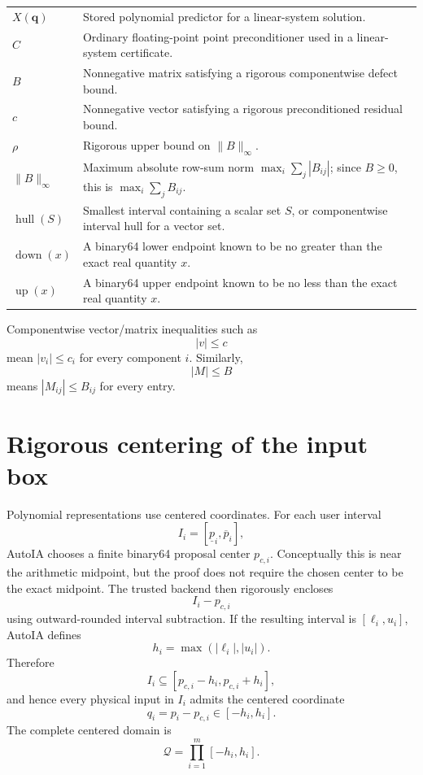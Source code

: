 \documentclass[11pt]{article}
\newcommand{\Qdom}{\mathcal{Q}}
\newcommand{\Hull}{\operatorname{hull}}
\newcommand{\down}{\operatorname{down}}
\newcommand{\up}{\operatorname{up}}
\newcommand{\qv}{\mathbf{q}}
\begin{document}
\begin{longtable}{p{}p{}}
\(X(\qv)\) & Stored polynomial predictor for a linear-system solution. \\
\(C\) & Ordinary floating-point point preconditioner used in a linear-system certificate. \\
\(B\) & Nonnegative matrix satisfying a rigorous componentwise defect bound. \\
\(c\) & Nonnegative vector satisfying a rigorous preconditioned residual bound. \\
\(\rho\) & Rigorous upper bound on \(\|B\|_\infty\). \\
\(\|B\|_\infty\) & Maximum absolute row-sum norm \(\max_i\sum_j |B_{ij}|\); since \(B\ge0\), this is \(\max_i\sum_jB_{ij}\). \\
\(\Hull(S)\) & Smallest interval containing a scalar set \(S\), or componentwise interval hull for a vector set. \\
\(\down(x)\) & A binary64 lower endpoint known to be no greater than the exact real quantity \(x\). \\
\(\up(x)\) & A binary64 upper endpoint known to be no less than the exact real quantity \(x\). \\
\bottomrule
\end{longtable}

Componentwise vector/matrix inequalities such as
\[
  |v|\le c
\]
mean \(|v_i|\le c_i\) for every component \(i\).  Similarly,
\[
  |M|\le B
\]
means \(|M_{ij}|\le B_{ij}\) for every entry.

\section{Rigorous centering of the input box}

Polynomial representations use centered coordinates.  For each user interval
\[
  I_i=[\underline p_i,\overline p_i],
\]
AutoIA chooses a finite binary64 proposal center \(p_{c,i}\).  Conceptually this
is near the arithmetic midpoint, but the proof does not require the chosen center
to be the exact midpoint.  The trusted backend then rigorously encloses
\[
  I_i-p_{c,i}
\]
using outward-rounded interval subtraction.  If the resulting interval is
\([\ell_i,u_i]\), AutoIA defines
\[
  h_i=\max(|\ell_i|,|u_i|).
\]
Therefore
\[
  I_i\subseteq[p_{c,i}-h_i,p_{c,i}+h_i],
\]
and hence every physical input in \(I_i\) admits the centered coordinate
\[
  q_i=p_i-p_{c,i}\in[-h_i,h_i].
\]
The complete centered domain is
\[
  \Qdom=\prod_{i=1}^m[-h_i,h_i].
\]
\end{document}
